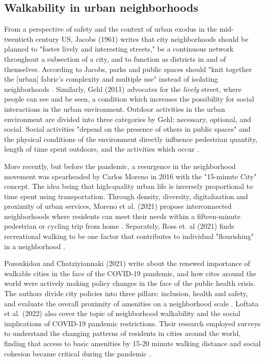 \begin{multicols}{2}

\section{Walkability in urban neighborhoods}
From a perspective of safety and the context of urban exodus in the mid-twentieth century US, Jacobs (1961) writes that city neighborhoods should be planned to "foster lively and interesting streets," be a continuous network throughout a subsection of a city, and to function as districts in and of themselves. According to Jacobs, parks and public spaces should "knit together the [urban] fabric's complexity and multiple use" instead of isolating neighborhoods \cite{jacobs_death_2020}. Similarly, Gehl (2011) advocates for the \textit{lively} street, where people can see and be seen, a condition which increases the possibility for social interactions in the urban environment. Outdoor activities in the urban environment are divided into three categories by Gehl: necessary, optional, and social. Social activities "depend on the presence of others in public spaces" and the physical conditions of the environment directly influence pedestrian quantity, length of time spent outdoors, and the activities which occur \cite{gehl_life_2011}. 

More recently, but before the pandemic, a resurgence in the neighborhood movement was spearheaded by Carlos Moreno in 2016 with the "15-minute City" concept. The idea being that high-quality urban life is inversely proportional to time spent using transportation. Through density, diversity, digitalization and proximity of urban services, Moreno et al. (2021) propose interconnected neighborhoods where residents can meet their needs within a fifteen-minute pedestrian or cycling trip from home \cite{moreno_introducing_2021}. Separately, Ross et. al (2021) finds recreational walking to be one factor that contributes to individual "flourishing" in a neighborhood \cite{ross_walking_2021}. 

Pozoukidou and Chatziyiannaki (2021) write about the renewed importance of walkable cities in the face of the COVID-19 pandemic, and how cites around the world were actively making policy changes in the face of the public health crisis. The authors divide city policies into three pillars: inclusion, health and safety, and evaluate the overall proximity of amenities on a neighborhood scale \cite{pozoukidou_15-minute_2021}. Loftata et al. (2022) also cover the topic of neighborhood walkability and the social implications of COVID-19 pandemic restrictions. Their research employed surveys to understand the changing patterns of residents in cities around the world, finding that access to basic amenities by 15-20 minute walking distance and social cohesion became critical during the pandemic \cite{lotfata_changing_2022}. 


\end{multicols}

